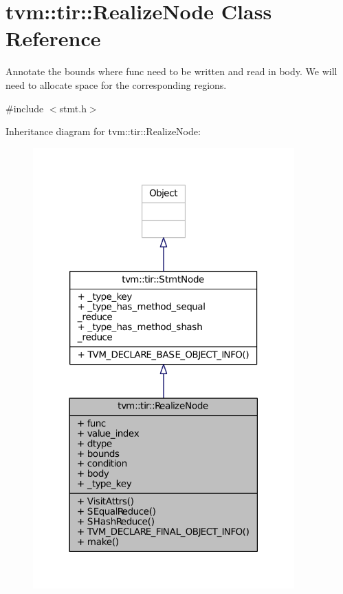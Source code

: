 \hypertarget{classtvm_1_1tir_1_1RealizeNode}{}\section{tvm\+:\+:tir\+:\+:Realize\+Node Class Reference}
\label{classtvm_1_1tir_1_1RealizeNode}


Annotate the bounds where func need to be written and read in body. We will need to allocate space for the corresponding regions.  




{\ttfamily \#include $<$stmt.\+h$>$}



Inheritance diagram for tvm\+:\+:tir\+:\+:Realize\+Node\+:
\nopagebreak
\begin{figure}[H]
\begin{center}
\leavevmode
\includegraphics[width=285pt]{classtvm_1_1tir_1_1RealizeNode__inherit__graph}
\end{center}
\end{figure}



